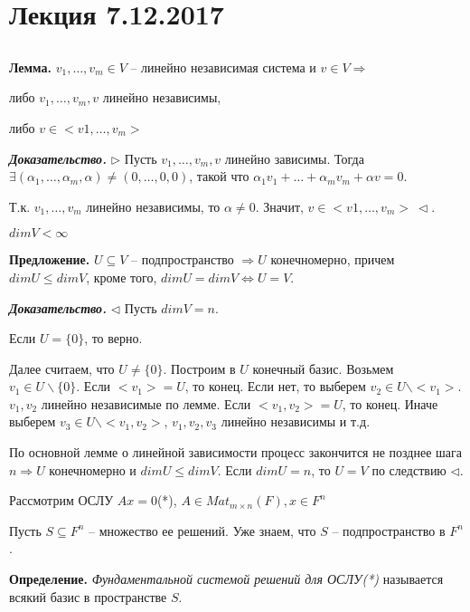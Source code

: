 \section{Лекция 7.12.2017}

\subsection{}

\textbf{Лемма.} $v_1, \dots, v_m \in V$ -- линейно независимая система и $v \in V \Rightarrow$

либо $v_1, \dots, v_m, v$ линейно независимы,

либо $v \in <v1, \dots, v_m>$

\bigskip
\textbf{\textit{Доказательство.}} $\rhd$ Пусть $v_1, \dots, v_m, v$ линейно зависимы. Тогда $\exists (\alpha_1, \dots, \alpha_m, \alpha) \neq (0, \dots, 0, 0)$, такой что $\alpha_1 v_1 + \dots + \alpha_m v_m + \alpha v = 0$.

Т.к. $v_1, \dots, v_m$ линейно независимы, то $\alpha \neq 0$. Значит, $v \in <v1, \dots, v_m> \ \lhd$.

$dimV < \infty$

\bigskip
\textbf{Предложение.} $U \subseteq V$ -- подпространство $\Rightarrow U$ конечномерно, причем $dim U \leq dim V$, кроме того, $dimU = dimV \Leftrightarrow U = V$.

\bigskip
\textbf{\textit{Доказательство.}} $\lhd$ Пусть $dimV = n$.

Если $U = \{0\}$, то верно.

Далее считаем, что $U \neq \{0\}$. Построим в $U$ конечный базис. Возьмем $v_1 \in U \backslash \{0\}$. Если $<v_1> = U$, то конец. Если нет, то выберем $v_2 \in U \backslash <v_1>$. $v_1, v_2$ линейно независимые по лемме. Если $<v_1, v_2> = U$, то конец. Иначе выберем $v_3 \in U \backslash <v_1, v_2>$, $v_1, v_2, v_3$ линейно независимы и т.д.

\bigskip
По основной лемме о линейной зависимости процесс закончится не позднее шага $n \Rightarrow U$ конечномерно и $dimU \leq dimV$. Если $dimU = n$, то $U = V$ по следствию $\lhd$. 

\bigskip
Рассмотрим ОСЛУ $Ax = 0$(*), $A \in Mat_{m \times n} (F), x \in F^n$

Пусть $S \subseteq F^n$ -- множество ее решений. Уже знаем, что $S$ -- подпространство в $F^n$.

\bigskip
\textbf{Определение.} \textit{Фундаментальной системой решений для ОСЛУ(*)} называется всякий базис в пространстве $S$.

